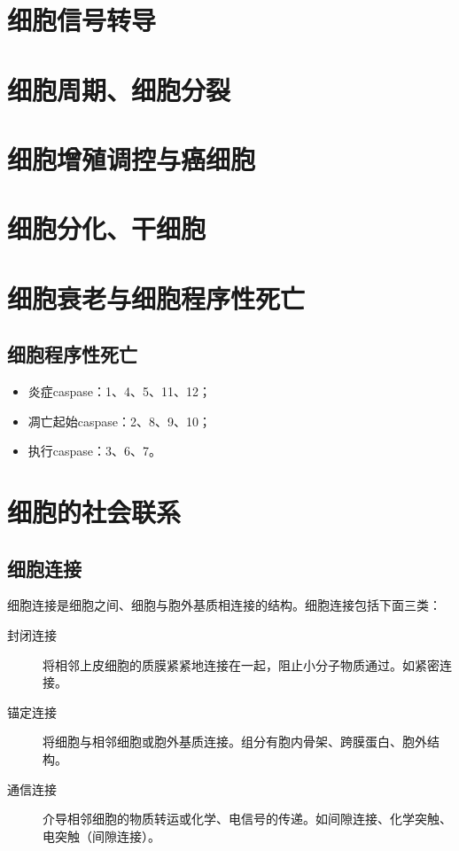 \section{细胞信号转导}

\section{细胞周期、细胞分裂}

\section{细胞增殖调控与癌细胞}





\section{细胞分化、干细胞}

\section{细胞衰老与细胞程序性死亡}

\subsection{细胞程序性死亡}

\begin{itemize}
	\item 炎症caspase：1、4、5、11、12；
	\item 凋亡起始caspase：2、8、9、10；
	\item 执行caspase：3、6、7。
\end{itemize}


\section{细胞的社会联系}

\subsection{细胞连接}

细胞连接是细胞之间、细胞与胞外基质相连接的结构。细胞连接包括下面三类：

\begin{description}
	\item[封闭连接] 将相邻上皮细胞的质膜紧紧地连接在一起，阻止小分子物质通过。如紧密连接。
	\item[锚定连接] 将细胞与相邻细胞或胞外基质连接。组分有胞内骨架、跨膜蛋白、胞外结构。
	\item[通信连接] 介导相邻细胞的物质转运或化学、电信号的传递。如间隙连接、化学突触、电突触（间隙连接）。
\end{description}

